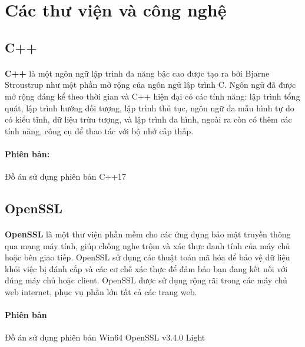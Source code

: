 \newpage
\section{Các thư viện và công nghệ}

\subsection{C++} 
\paragraph{}{\textbf{C++} \cite{c++} là một ngôn ngữ lập trình đa năng bậc cao được tạo ra bởi Bjarne Stroustrup như một phần mở rộng của ngôn ngữ lập trình C. Ngôn ngữ đã được mở rộng đáng kể theo thời gian và C++ hiện đại có các tính năng: lập trình tổng quát, lập trình hướng đối tượng, lập trình thủ tục, ngôn ngữ đa mẫu hình tự do có kiểu tĩnh, dữ liệu trừu tượng, và lập trình đa hình, ngoài ra còn có thêm các tính năng, công cụ để thao tác với bộ nhớ cấp thấp.}
\paragraph{Phiên bản:}{Đồ án sử dụng phiên bản C++17}

\subsection{OpenSSL} 
\paragraph{}{\textbf{OpenSSL} \cite{openssl} là một thư viện phần mềm cho các ứng dụng bảo mật truyền thông qua mạng máy tính, giúp chống nghe trộm và xác thực danh tính của máy chủ hoặc bên giao tiếp. OpenSSL sử dụng các thuật toán mã hóa để bảo vệ dữ liệu khỏi việc bị đánh cắp và các cơ chế xác thực để đảm bảo bạn đang kết nối với đúng máy chủ hoặc client. OpenSSL được sử dụng rộng rãi trong các máy chủ web internet, phục vụ phần lớn tất cả các trang web.}
\paragraph{Phiên bản}{Đồ án sử dụng phiên bản Win64 OpenSSL v3.4.0 Light \cite{openssl340}}

